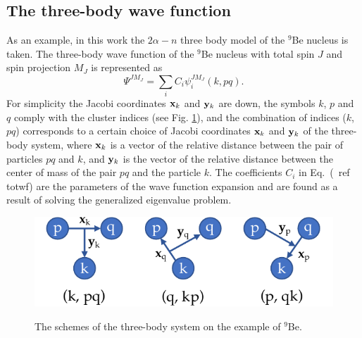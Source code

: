\documentclass[12pt,a4paper,twoside]{article}
\begin{document}
  

\subsection{The three-body wave function}

As an example, in this work the $2\alpha-n$ three body model of the $^9$Be nucleus is taken. The three-body wave function of the $^9$Be nucleus with total spin $ J $ and spin projection $ M_J $ is represented as
 \begin{equation}
 \Psi^{JM_J}= \sum_{i} C_{i} \psi_{i}^{JM_J} \left( k,pq \right).
 \label{totwf}
 \end{equation}
For simplicity the Jacobi coordinates $ {\bf x}_k $ and $ {\bf y}_k $ are down, the symbols $ k $, $ p $ and $ q $ comply with the cluster indices (see Fig. \ref{fig:jacobiSet}), and the combination of indices ($ k $, $ pq $) corresponds to a certain choice of Jacobi coordinates $ {\bf x}_k $ and $ {\bf y}_k $ of the three-body system, where $ {\bf x}_k $ is a vector of the relative distance between the pair of particles $ pq $ and $ k $, and $ {\bf y}_k $ is the vector of the relative distance between the center of mass of the pair $ pq $ and the particle $ k $. 
The coefficients $ C_{i} $ in Eq.~(\ ref {totwf}) are the parameters of the wave function expansion and are found as a result of solving the generalized eigenvalue problem. 

\begin{figure}[b]
\centering
\includegraphics[scale=0.15]{pic1}\\
\caption{The schemes of the three-body system on the example of ${}^9$Be.}
\label{fig:jacobiSet}
\end{figure}
\end{document}
